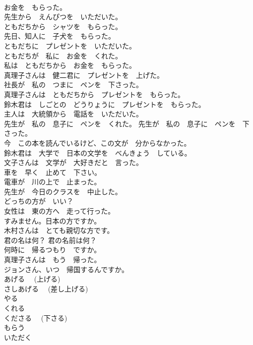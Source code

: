 \documentclass[8pt]{extreport}
\begin{document}
\begin{CJK}{UTF8}{min}
\\	お金を　もらった。	
\\	先生から　えんぴつを　いただいた。	
\\	ともだちから　シャツを　もらった。	
\\	先日、知人に　子犬を　もらった。	
\\	ともだちに　プレゼントを　いただいた。	
\\	ともだちが　私に　お金を　くれた。	
\\	私は　ともだちから　お金を　もらった。	
\\	真理子さんは　健二君に　プレゼントを　上げた。	
\\	社長が　私の　つまに　ペンを　下さった。	
\\	真理子さんは　ともだちから　プレゼントを　もらった。	
\\	鈴木君は　しごとの　どうりょうに　プレゼントを　もらった。	
\\	主人は　大統領から　電話を　いただいた。	
\\	先生が　私の　息子に　ペンを　くれた。 先生が　私の　息子に　ペンを　下さった。	
\\	今　この本を読んでいるけど、この文が　分からなかった。	
\\	鈴木君は　大学で　日本の文学を　べんきょう　している。	
\\	文子さんは　文学が　大好きだと　言った。	
\\	車を　早く　止めて　下さい。	
\\	電車が　川の上で　止まった。	
\\	先生が　今日のクラスを　中止した。	
\\	どっちの方が　いい？	
\\	女性は　東の方へ　走って行った。	
\\	すみません。日本の方ですか。	
\\	木村さんは　とても親切な方です。	
\\	君の名は何？ 君の名前は何？	
\\	何時に　帰るつもり　ですか。	
\\	真理子さんは　もう　帰った。	
\\	ジョンさん、いつ　帰国するんですか。	
\\	あげる　 (上げる)	
\\	さしあげる　 (差し上げる)	
\\	やる	
\\	くれる	
\\	くださる　 (下さる)	
\\	もらう	
\\	いただく	

\end{CJK}
\end{document}
